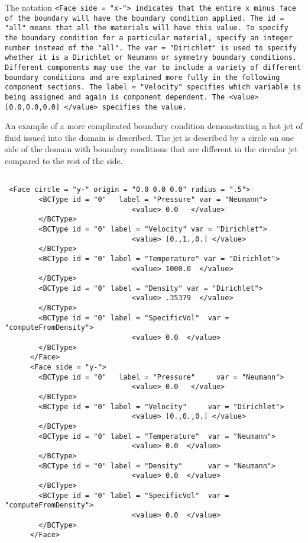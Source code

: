 The notation \tt <Face side = "x-"> \normalfont indicates that the
entire x minus face of the boundary will have the boundary condition
applied.  The \tt id = "all" \normalfont means that all the
materials will have this value.  To specify the boundary condition for
a particular material, specify an integer number instead of the
"all".  The \tt var = "Dirichlet" \normalfont is used to specify
whether it is a Dirichlet or Neumann or symmetry boundary conditions.
Different components may use the \tt var \normalfont to include a
variety of different boundary conditions and are explained more fully
in the following component sections.  The \tt label = "Velocity"
\normalfont specifies which variable is being assigned and again is
component dependent.  The \tt <value> [0.0,0.0,0.0] </value>
\normalfont specifies the value.

An example of a more complicated boundary condition demonstrating a
hot jet of fluid issued into the domain is described.  The jet is
described by a circle on one side of the domain with boundary
conditions that are different in the circular jet compared to the rest
of the side.

\begin{Verbatim}[fontsize=\footnotesize]

 <Face circle = "y-" origin = "0.0 0.0 0.0" radius = ".5">
        <BCType id = "0"   label = "Pressure" var = "Neumann">
                              <value> 0.0   </value>
        </BCType>
        <BCType id = "0" label = "Velocity" var = "Dirichlet">
                              <value> [0.,1.,0.] </value>
        </BCType>
        <BCType id = "0" label = "Temperature" var = "Dirichlet">
                              <value> 1000.0  </value>
        </BCType>
        <BCType id = "0" label = "Density" var = "Dirichlet">
                              <value> .35379  </value>
        </BCType>
        <BCType id = "0" label = "SpecificVol"  var = "computeFromDensity">
                              <value> 0.0  </value>
        </BCType>
      </Face>
      <Face side = "y-">
        <BCType id = "0"   label = "Pressure"     var = "Neumann">
                              <value> 0.0   </value>
        </BCType>
        <BCType id = "0" label = "Velocity"     var = "Dirichlet">
                              <value> [0.,0.,0.] </value>
        </BCType>
        <BCType id = "0" label = "Temperature"  var = "Neumann">
                              <value> 0.0  </value>
        </BCType>
        <BCType id = "0" label = "Density"      var = "Neumann">
                              <value> 0.0  </value>
        </BCType>
        <BCType id = "0" label = "SpecificVol"  var = "computeFromDensity">
                              <value> 0.0  </value>
        </BCType>
      </Face>

\end{Verbatim}


